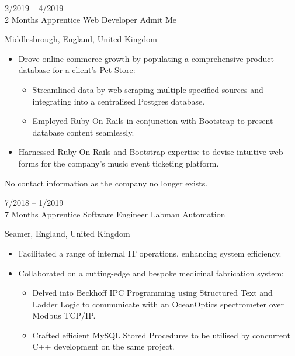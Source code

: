 \documentclass[9pt]{developercv} %
\begin{document}
\begin{entrylist}
{		\vspace{1em}
		\hspace{2em}
		\vspace{1em}
		}
	\entry
		{2/2019 -- 4/2019\\2 Months}
		{Apprentice Web Developer}
		{Admit Me}
		{Middlesbrough, England, United Kingdom
		
		\begin{itemize}
			\item[\ding{117}] Drove online commerce growth by populating a comprehensive product database for a client's Pet Store:
			\begin{itemize}
				\item[\ding{118}] Streamlined data by web scraping multiple specified sources and integrating into a centralised Postgres database.
				\item[\ding{118}] Employed Ruby-On-Rails in conjunction with Bootstrap to present database content seamlessly.
			\end{itemize}
			\item[\ding{117}] Harnessed Ruby-On-Rails and Bootstrap expertise to devise intuitive web forms for the company's music event ticketing platform.
		\end{itemize}	

		\vspace{1em}
		 No contact information as the company no longer exists.
		\vspace{1em}

		}
	\entry
		{7/2018 -- 1/2019\\7 Months}
		{Apprentice Software Engineer}
		{Labman Automation}
		{Seamer, England, United Kingdom
		
		\begin{itemize}
			\item[\ding{117}] Facilitated a range of internal IT operations, enhancing system efficiency.
			\item[\ding{117}] Collaborated on a cutting-edge and bespoke medicinal fabrication system:
			\begin{itemize}
				\item[\ding{118}] Delved into Beckhoff IPC Programming using Structured Text and Ladder Logic to communicate with an OceanOptics spectrometer over Modbus TCP/IP.
				\item[\ding{118}] Crafted efficient MySQL Stored Procedures to be utilised by concurrent C++ development on the same project.
			\end{itemize}
		\end{itemize}

		\vspace{1em}
		\hspace{2em}
		\vspace{1em}
		}
		

\end{entrylist}
\end{document}
